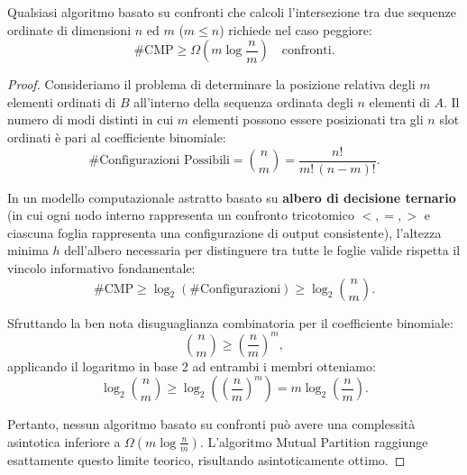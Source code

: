 \begin{theorem}
Qualsiasi algoritmo basato su confronti che calcoli l'intersezione tra due sequenze ordinate di dimensioni $n$ ed $m$ ($m \le n$) richiede nel caso peggiore:
\begin{equation}
  \#\text{CMP} \ge \Omega\left(m \log \frac{n}{m}\right) \quad \text{confronti}.
\end{equation}
\end{theorem}
\begin{proof}
Consideriamo il problema di determinare la posizione relativa degli $m$ elementi ordinati di $B$ all'interno della sequenza ordinata degli $n$ elementi di $A$. Il numero di modi distinti in cui $m$ elementi possono essere posizionati tra gli $n$ slot ordinati è pari al coefficiente binomiale:
\begin{equation}
  \#\text{Configurazioni Possibili} = \binom{n}{m} = \frac{n!}{m! \, (n - m)!}.
\end{equation}

In un modello computazionale astratto basato su \textbf{albero di decisione ternario} (in cui ogni nodo interno rappresenta un confronto tricotomico $<, =, >$ e ciascuna foglia rappresenta una configurazione di output consistente), l'altezza minima $h$ dell'albero necessaria per distinguere tra tutte le foglie valide rispetta il vincolo informativo fondamentale:
\begin{equation}
  \#\text{CMP} \ge \log_2(\#\text{Configurazioni}) \ge \log_2 \binom{n}{m}.
\end{equation}

Sfruttando la ben nota disuguaglianza combinatoria per il coefficiente binomiale:
\begin{equation}
  \binom{n}{m} \ge \left(\frac{n}{m}\right)^m,
\end{equation}
applicando il logaritmo in base 2 ad entrambi i membri otteniamo:
\begin{equation}
  \log_2 \binom{n}{m} \ge \log_2 \left(\left(\frac{n}{m}\right)^m\right) = m \log_2 \left(\frac{n}{m}\right).
\end{equation}

Pertanto, nessun algoritmo basato su confronti può avere una complessità asintotica inferiore a $\Omega\left(m \log \frac{n}{m}\right)$. L'algoritmo Mutual Partition raggiunge esattamente questo limite teorico, risultando asintoticamente ottimo.
\end{proof}

